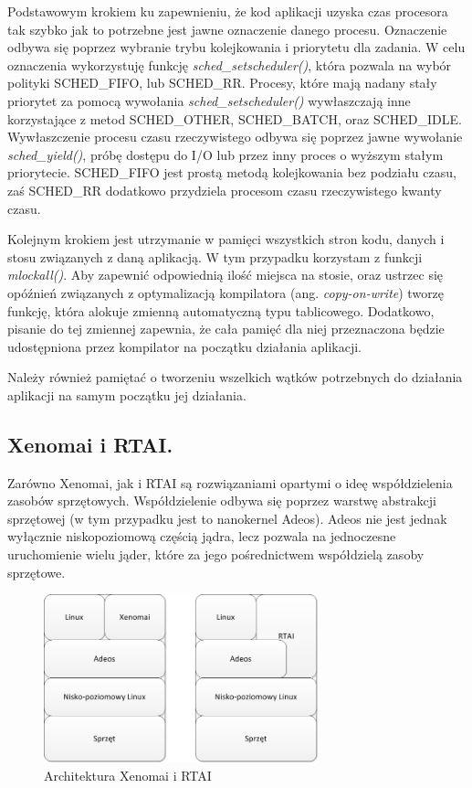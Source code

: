 Podstawowym krokiem ku zapewnieniu, że kod aplikacji uzyska czas procesora tak szybko jak to potrzebne jest jawne oznaczenie danego procesu. Oznaczenie odbywa się poprzez wybranie trybu kolejkowania i priorytetu dla zadania. W celu oznaczenia wykorzystuję funkcję \emph{sched\_setscheduler()}, która pozwala na wybór polityki SCHED\_FIFO, lub SCHED\_RR. Procesy, które mają nadany stały priorytet za pomocą wywołania \emph{sched\_setscheduler()} wywłaszczają inne korzystające z metod SCHED\_OTHER, SCHED\_BATCH, oraz SCHED\_IDLE. Wywłaszczenie procesu czasu rzeczywistego odbywa się poprzez jawne wywołanie \emph{sched\_yield()}, próbę dostępu do I/O lub przez inny proces o wyższym stałym priorytecie. SCHED\_FIFO jest prostą metodą kolejkowania bez podziału czasu, zaś SCHED\_RR dodatkowo przydziela procesom czasu rzeczywistego kwanty czasu. 

Kolejnym krokiem jest utrzymanie w pamięci wszystkich stron kodu, danych i stosu związanych z daną aplikacją. W tym przypadku korzystam z funkcji \emph{mlockall()}. Aby zapewnić odpowiednią ilość miejsca na stosie, oraz ustrzec się opóźnień związanych z optymalizacją kompilatora (ang. \emph{copy-on-write}) tworzę funkcję, która alokuje zmienną automatyczną typu tablicowego. Dodatkowo, pisanie do tej zmiennej zapewnia, że cała pamięć dla niej przeznaczona będzie udostępniona przez kompilator na początku działania aplikacji.

Należy również pamiętać o tworzeniu wszelkich wątków potrzebnych do działania aplikacji na samym początku jej działania.

\subsection{Xenomai i RTAI.}

Zarówno Xenomai, jak i RTAI są rozwiązaniami opartymi o ideę współdzielenia zasobów sprzętowych. Współdzielenie odbywa się poprzez warstwę abstrakcji sprzętowej (w tym przypadku jest to nanokernel Adeos). Adeos nie jest jednak wyłącznie niskopoziomową częścią jądra, lecz pozwala na jednoczesne uruchomienie wielu jąder, które za jego pośrednictwem współdzielą zasoby sprzętowe. 

\begin{figure}[htb]
\begin{center}
\includegraphics[width=300px]{img/XenomaiRTAI}
\caption{Architektura Xenomai i RTAI}
\label{XenomaiRTAI}
\end{center}
\end{figure}


